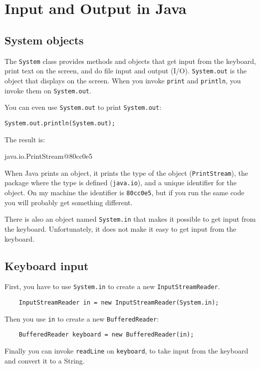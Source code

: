 \chapter{Input and Output in Java}
\label{javaio}

\section{System objects}
\label{system}

The {\tt System} class provides
methods and objects that get input from the keyboard,
print text on the screen, and do file input and output (I/O).
%
{\tt System.out} is the object that displays
on the screen.  When you invoke {\tt print} and {\tt println}, you
invoke them on {\tt System.out}.

You can even use {\tt System.out} to print {\tt System.out}:

\begin{lstlisting}
System.out.println(System.out);
\end{lstlisting}
%
The result is:

\begin{stdout}
java.io.PrintStream@80cc0e5
\end{stdout}
%
When Java prints an object, it prints the type
of the object ({\tt PrintStream}), the package
where the type is defined ({\tt java.io}), and a
unique identifier for the object.  On my machine the identifier
is {\tt 80cc0e5}, but if you run the same code you will
probably get something different.

There is also an object named {\tt System.in} that makes it
possible to get input from the keyboard.  Unfortunately,
it does not make it easy to get input from the keyboard.


\section{Keyboard input}
\label{keyboard}

First, you have to use {\tt System.in} to create a new
{\tt InputStreamReader}.

\begin{lstlisting}
    InputStreamReader in = new InputStreamReader(System.in);
\end{lstlisting}
%
Then you use {\tt in} to create a new {\tt BufferedReader}:

\begin{lstlisting}
    BufferedReader keyboard = new BufferedReader(in);
\end{lstlisting}
%
Finally you can invoke {\tt readLine} on {\tt keyboard},
to take input from the keyboard and convert it to a
String.

